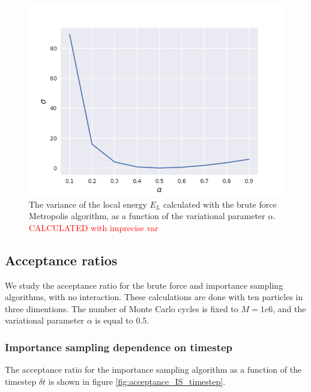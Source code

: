 \documentclass[norsk,a4paper,12pt]{article}
\begin{document}
\begin{figure} [H]
	\centering
	\includegraphics[scale=0.65]{images/variance.png}
	\caption{The variance of the local energy $E_L$ calculated with the brute force Metropolis algorithm, as a function of the variational parameter $\alpha$. \textcolor{red}{CALCULATED with imprecise var}}
	\label{fig:variance_EL_as_func_of_alpha}
\end{figure} 

\subsection{Acceptance ratios}
We study the acceptance ratio for the brute force and importance sampling algorithms, with no interaction. These calculations are done with ten particles in three dimentions. The number of Monte Carlo cycles is fixed to $M=1e6$, and the variational parameter $\alpha$ is equal to $0.5$.

\subsubsection{Importance sampling dependence on timestep }
The acceptance ratio for the importance sampling algorithm as a function of the timestep $\delta t$ is shown in figure \ref{fig:acceptance_IS_timestep}. 
\end{document}
